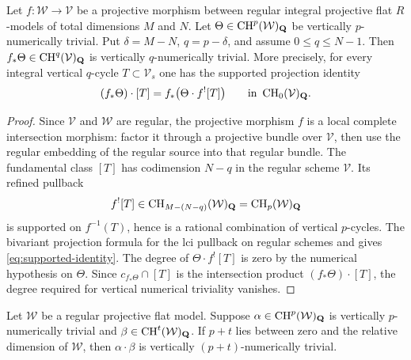 \begin{lemma}
\label{lem:supported-numerical-projection}
Let $f:\mathcal W\to\mathcal V$ be a projective morphism between
regular integral projective flat $R$-models of total dimensions
$M$ and $N$.  Let $\Theta\in\operatorname{CH}^p(\mathcal W)_{\mathbf Q}$ be
vertically $p$-numerically trivial.  Put
$\delta=M-N$, $q=p-\delta$, and assume $0\le q\le N-1$.
Then $f_*\Theta\in\operatorname{CH}^q(\mathcal V)_{\mathbf Q}$ is vertically
$q$-numerically trivial.
More precisely, for every integral vertical $q$-cycle
$T\subset\mathcal V_s$ one has the supported projection identity
\begin{equation}\label{eq:supported-identity}
 (f_*\Theta)\cdot[T]
   = f_*\bigl(\Theta\cdot f^![T]\bigr)
                      \qquad\text{in }\operatorname{CH}_0(\mathcal V)_{\mathbf Q}.
\end{equation}
\end{lemma}

\begin{proof}
Since $\mathcal V$ and $\mathcal W$ are regular, the projective
morphism $f$ is a local complete intersection morphism: factor it
through a projective bundle over $\mathcal V$, then use the
regular embedding of the regular source into that regular bundle.
The fundamental class $[T]$ has codimension $N-q$ in the regular
scheme $\mathcal V$.  Its refined pullback
\[
       f^![T]\in\operatorname{CH}_{M-(N-q)}(\mathcal W)_{\mathbf Q}
                   =\operatorname{CH}_p(\mathcal W)_{\mathbf Q}
\]
is supported on $f^{-1}(T)$, hence is a rational combination of
vertical $p$-cycles.  The bivariant projection formula for the
lci pullback on regular schemes
\cite[Chapter~17]{Fulton} and \cite[Tags~0FF6 and 0FFA]{StacksGysin}
gives \eqref{eq:supported-identity}.
The degree of $\Theta\cdot f^![T]$ is zero by the numerical
hypothesis on $\Theta$.  Since $c_{f_*\Theta}\cap[T]$ is the
intersection product $(f_*\Theta)\cdot[T]$, the degree required
for vertical numerical triviality vanishes.
\end{proof}

\begin{lemma}
\label{lem:numerical-times-class}
Let $\mathcal W$ be a regular projective flat model.  Suppose
$\alpha\in\operatorname{CH}^p(\mathcal W)_{\mathbf Q}$ is vertically
$p$-numerically trivial and
$\beta\in\operatorname{CH}^t(\mathcal W)_{\mathbf Q}$.
If $p+t$ lies between zero and the relative dimension of
$\mathcal W$, then $\alpha\cdot\beta$ is vertically
$(p+t)$-numerically trivial.
\end{lemma}

